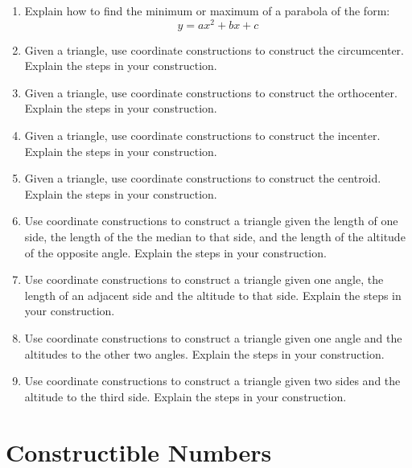 \begin{problems}
\begin{enumerate}
\item Explain how to find the minimum or maximum of a parabola of the form:
\[
y = ax^2 + bx + c
\]
\item Given a triangle, use coordinate constructions to construct the
  circumcenter. Explain the steps in your
  construction.
\item Given a triangle, use coordinate constructions to construct the
  orthocenter. Explain the steps in your
  construction.
\item Given a triangle, use coordinate constructions to construct the
  incenter. Explain the steps in your construction.
\item Given a triangle, use coordinate constructions to construct the
  centroid. Explain the steps in your construction.
\item Use coordinate constructions to construct a triangle given the
  length of one side, the length of the the median to that side, and
  the length of the altitude of the opposite angle. Explain the steps
  in your construction.
\item Use coordinate constructions to construct a triangle given one
  angle, the length of an adjacent side and the altitude to that
  side. Explain the steps in your construction.
\item Use coordinate constructions to construct a triangle given one
  angle and the altitudes to the other two angles. Explain the steps
  in your construction.
\item Use coordinate constructions to construct a triangle given two
  sides and the altitude to the third side. Explain the steps in your
  construction.
\end{enumerate}
\end{problems}

\newpage







\section{Constructible Numbers}


